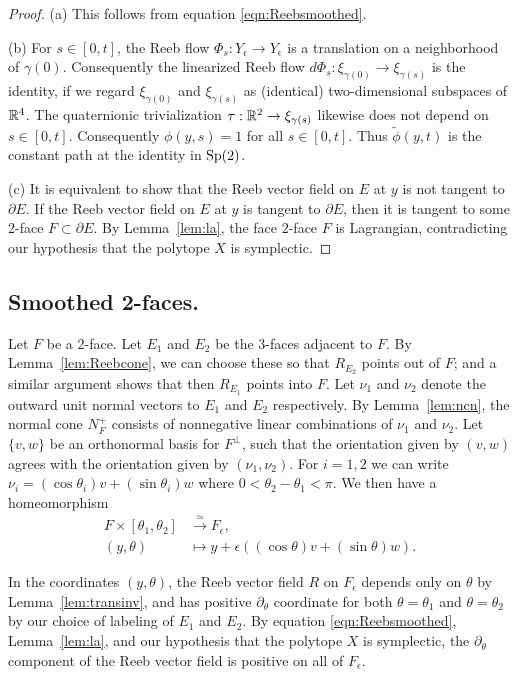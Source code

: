 \begin{proof}
(a)
This follows from equation \eqref{eqn:Reebsmoothed}.

(b) For $s\in[0,t]$, the Reeb flow $\Phi_s:Y_\epsilon\to Y_\epsilon$ is a translation on a neighborhood of $\gamma(0)$. Consequently the linearized Reeb flow $d\Phi_s:\xi_{\gamma(0)}\to \xi_{\gamma(s)}$ is the identity, if we regard $\xi_{\gamma(0)}$ and $\xi_{\gamma(s)}$ as (identical) two-dimensional subspaces of ${\mathbb R}^4$. The quaternionic trivialization $\tau:{\mathbb R}^2\to \xi_{\gamma(s)}$ likewise does not depend on $s\in[0,t]$. Consequently $\phi(y,s)=1$ for all $s\in[0,t]$. Thus $\widetilde{\phi}(y,t)$ is the constant path at the identity in $\operatorname{Sp}(2)$.

(c)
It is equivalent to show that the Reeb vector field on $E$ at $y$ is not tangent to $\partial E$. If the Reeb vector field on $E$ at $y$ is tangent to $\partial E$, then it is tangent to some $2$-face $F\subset \partial E$. By Lemma~\ref{lem:la}, the face $2$-face $F$ is Lagrangian, contradicting our hypothesis that the polytope $X$ is symplectic.
\end{proof}

\subsection*{Smoothed 2-faces.}
Let $F$ be a $2$-face. Let $E_1$ and $E_2$ be the $3$-faces adjacent to $F$. By Lemma~\ref{lem:Reebcone}, we can choose these so that $R_{E_2}$ points out of $F$; and a similar argument shows that then $R_{E_1}$ points into $F$. Let $\nu_1$ and $\nu_2$ denote the outward unit normal vectors to $E_1$ and $E_2$ respectively. By Lemma~\ref{lem:ncn}, the normal cone $N_F^+$ consists of nonnegative linear combinations of $\nu_1$ and $\nu_2$. Let $\{v,w\}$ be an orthonormal basis for $F^\perp$, such that the orientation given by $(v,w)$ agrees with the orientation given by $(\nu_1,\nu_2)$. For $i=1,2$ we can write $\nu_i=(\cos\theta_i) v + (\sin\theta_i) w$ where $0<\theta_2-\theta_1 < \pi$. We then have a homeomorphism
\begin{equation}
\label{eqn:smoothed2face}
\begin{split}
F \times [\theta_1,\theta_2] &\stackrel{\simeq}{\longrightarrow} F_\epsilon,\\
(y,\theta) &\longmapsto 
y+\epsilon((\cos\theta) v + (\sin\theta) w).
\end{split}
\end{equation}

In the coordinates $(y,\theta)$, the Reeb vector field $R$ on $F_\epsilon$ depends only on $\theta$ by Lemma~\ref{lem:transinv}, and has positive $\partial_\theta$ coordinate for both $\theta=\theta_1$ and $\theta=\theta_2$ by our choice of labeling of $E_1$ and $E_2$. By equation \eqref{eqn:Reebsmoothed}, Lemma~\ref{lem:la}, and our hypothesis that the polytope $X$ is symplectic, the $\partial_\theta$ component of the Reeb vector field is positive on all of $F_\epsilon$.

